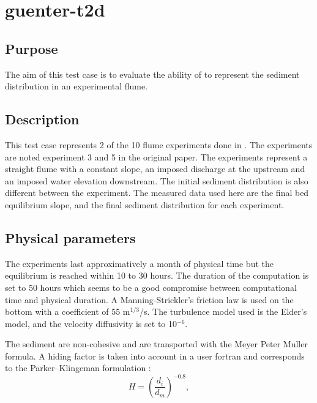 \chapter{guenter-t2d}
%

%
\section{Purpose}
The aim of this test case is to evaluate the ability of \gaia{} to represent the sediment distribution in an experimental flume.

\section{Description}
This test case represents 2 of the 10 flume experiments done in \cite{gunter1971kritische}. The experiments are noted experiment 3 and 5 in the original paper. The experiments represent a straight flume with a constant slope, an imposed discharge at the upstream and an imposed water elevation downstream. The initial sediment distribution is also different between the experiment. The measured data used here are the final bed equilibrium slope, and the final sediment distribution for each experiment.

\section{Physical parameters}

The experiments last approximatively a month of physical time but the equilibrium is reached within 10 to 30 hours. The duration of the computation is set to 50 hours which seems to be a good compromise between computational time and physical duration.
%
A Manning-Strickler's friction law is used on the bottom with a coefficient of 55 m$^{1/3}$/s.
%
The turbulence model used is the Elder's model, and the velocity diffusivity is set to 10$^{-6}$.

The sediment are non-cohesive and are transported with the Meyer Peter Muller formula. A hiding factor is taken into account in a user fortran and corresponds to the Parker–Klingeman formulation \cite{ParkerKlingeman1982}:
\begin{equation}
 H=\left(\dfrac{d_i}{d_m}\right)^{-0.8},
\end{equation}

